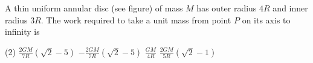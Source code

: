 
\item A thin uniform annular disc (see figure) of mass \( M \) has outer radius \( 4R \) and inner radius \( 3R \). The work required to take a unit mass from point \( P \) on its axis to infinity is
    \begin{center}
    \end{center}
    \begin{tasks}(2)
        \task \( \frac{2GM}{7R} \left(\sqrt{2} - 5\right) \)
        \task \( -\frac{2GM}{7R} \left(\sqrt{2} - 5\right) \)
        \task \( \frac{GM}{4R} \)
        \task \( \frac{2GM}{5R} \left(\sqrt{2} - 1\right) \)
    \end{tasks}
